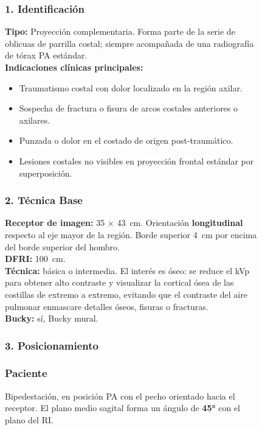 \begin{figure}
{%
\subsubsection*{1. Identificación}

\textbf{Tipo:} Proyección complementaria. Forma parte de la serie de oblicuas de parrilla costal; siempre acompañada de una radiografía de tórax PA estándar.\\

\textbf{Indicaciones clínicas principales:}

\begin{itemize}
  \item Traumatismo costal con dolor localizado en la región axilar.
  \item Sospecha de fractura o fisura de arcos costales anteriores o axilares.
  \item Punzada o dolor en el costado de origen post-traumático.
  \item Lesiones costales no visibles en proyección frontal estándar por superposición.
\end{itemize}

\subsubsection*{2. Técnica Base}

\textbf{Receptor de imagen:} 35 $\times$ 43~cm. Orientación \textbf{longitudinal} respecto al eje mayor de la región. Borde superior 4~cm por encima del borde superior del hombro.\\

\textbf{DFRI:} 100~cm.\\

\textbf{Técnica:} básica o intermedia. El interés es óseo: se reduce el kVp para obtener alto contraste y visualizar la cortical ósea de las costillas de extremo a extremo, evitando que el contraste del aire pulmonar enmascare detalles óseos, fisuras o fracturas.\\

\textbf{Bucky:} sí, Bucky mural.

\subsubsection*{3. Posicionamiento}

\subsubsection*{Paciente}
Bipedestación, en posición PA con el pecho orientado hacia el receptor. El plano medio sagital forma un ángulo de \textbf{45°} con el plano del RI.

}
\end{figure}
